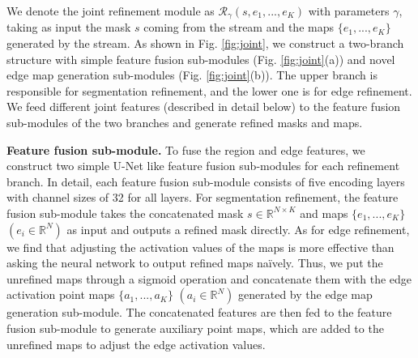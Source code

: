 \documentclass[runningheads]{llncs}
\begin{document}
We denote the joint refinement module as $\mathcal{R_\gamma}(s, e_1,...,e_K)$ with parameters $\gamma$, taking as input the {\SemSegPoint} mask $s$ coming from the {\SemSeg} stream and the {\SemEdgePoint} maps $\{e_1,...,e_K\}$ generated by the {\SemEdgeD} stream. As shown in Fig. \ref{fig:joint}, we construct a two-branch structure with simple feature fusion sub-modules (Fig. \ref{fig:joint}(a)) and novel edge map generation sub-modules (Fig. \ref{fig:joint}(b)). The upper branch is responsible for segmentation refinement, and the lower one is for edge refinement. We feed different joint features (described in detail below) to the feature fusion sub-modules of the two branches and generate refined {\SemSegPoint} masks and {\SemEdgePoint} maps.




\smallskip \noindent \textbf{Feature fusion {sub-module}.} To fuse the region and edge features, we construct two simple U-Net \cite{Ronneberger_2015} like feature fusion {sub-modules} for each refinement branch. In detail, each feature fusion {sub-module} consists of five encoding layers with channel sizes of 32 for all layers. For segmentation refinement, the feature fusion {sub-module} takes the concatenated {\SemSegPoint} mask $s \in \mathbb{R}^{N \times K}$ and {\SemEdgePoint} maps $\{e_1,...,e_K\}$ $(e_i \in \mathbb{R}^{N})$ as input and outputs a refined {\SemSegPoint} mask directly. As for edge refinement, we find that adjusting the activation values of the {\SemEdgePoint} maps is more effective than asking the neural network to output refined {\SemEdgePoint} maps na\"{i}vely. Thus, we put the unrefined {\SemEdgePoint} maps through a sigmoid operation and concatenate them with the edge activation point maps $\{a_{1},...,a_{K}\}$ $(a_i \in \mathbb{R}^{N})$ generated by the edge map generation {sub-module}. The concatenated features are then fed to the feature fusion {sub-module} to generate auxiliary point maps, which are added to the unrefined {\SemEdgePoint} maps to adjust the edge activation values.
\end{document}
